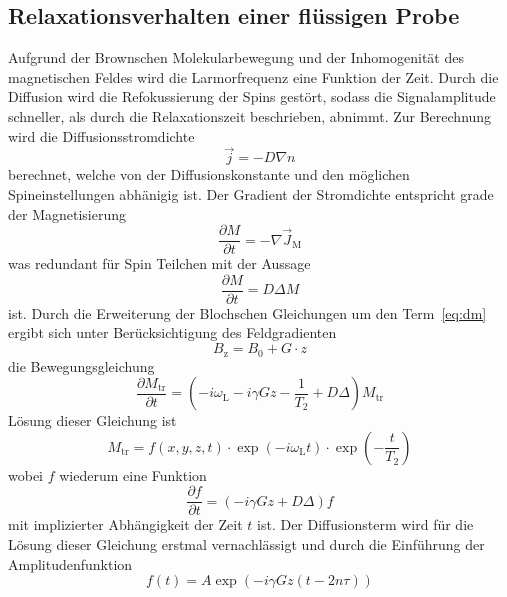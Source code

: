 \subsection{Relaxationsverhalten einer flüssigen Probe}%
\label{sub:relaxationsverhalten_einer_fluessigen_probe}
Aufgrund der Brownschen Molekularbewegung und der Inhomogenität des
magnetischen Feldes wird die Larmorfrequenz eine Funktion der Zeit. 
Durch die Diffusion wird die Refokussierung der Spins gestört, sodass die
Signalamplitude schneller, als durch die Relaxationszeit beschrieben, abnimmt.
Zur Berechnung wird die Diffusionsstromdichte 
\begin{equation}
		\vec{j} = -D \nabla n	
\end{equation}
berechnet, welche von der Diffusionskonstante und den möglichen
Spineinstellungen abhänigig ist. 
Der Gradient der Stromdichte entspricht grade der Magnetisierung
\begin{equation}
		\frac{\partial M}{\partial t} = - \nabla \vec{J}_\text{M}
\end{equation}
was redundant für Spin  Teilchen mit der Aussage 
\begin{equation}
		\label{eq:dm}
		\frac{\partial M}{\partial t} = D \Delta M
\end{equation}
ist. Durch die Erweiterung der Blochschen Gleichungen um den Term~\ref{eq:dm}
ergibt sich unter Berücksichtigung des Feldgradienten
\begin{equation}
		\label{eq:gradB}
		B_\text{z} = B_0 + G \cdot z
\end{equation}
die Bewegungsgleichung
\begin{equation}
		\frac{\partial M_\text{tr}}{\partial t} = \left(- i \omega_\text{L} - i \gamma
Gz - \frac{1}{T_2} + D \Delta \right) M_\text{tr}
\end{equation}
Lösung dieser Gleichung ist 
\begin{equation}
		M_\text{tr} = f(x,y,z,t) \cdot \exp(-i\omega_\text{L}t) \cdot
		\exp\left(-\frac{t}{T_\text{2}}\right)
\end{equation}
wobei $f$ wiederum eine Funktion  
\begin{equation}
		\frac{\partial f}{\partial t} = \left(-i \gamma Gz + D \Delta \right) f
\end{equation}
mit implizierter Abhängigkeit der Zeit $t$ ist.
Der Diffusionsterm wird für die Lösung dieser Gleichung erstmal vernachlässigt 
und durch die Einführung der Amplitudenfunktion 
\begin{equation}
		f(t) = A \exp \left( -i \gamma Gz ( t -2n\tau) \right)
\end{equation}
